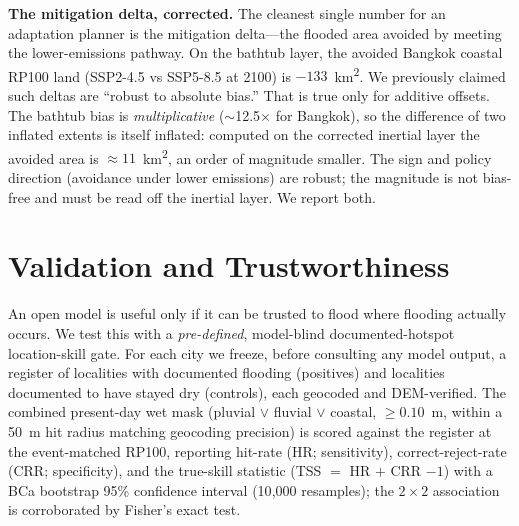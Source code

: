 \documentclass[conference]{IEEEtran}
\begin{document}
\textbf{The mitigation delta, corrected.} The cleanest single number for an adaptation planner is the mitigation delta---the flooded area avoided by meeting the lower-emissions pathway. On the bathtub layer, the avoided Bangkok coastal RP100 land (SSP2-4.5 vs SSP5-8.5 at 2100) is $-133$~km\textsuperscript{2}. We previously claimed such deltas are ``robust to absolute bias.'' That is true only for additive offsets. The bathtub bias is \emph{multiplicative} ($\sim$12.5$\times$ for Bangkok), so the difference of two inflated extents is itself inflated: computed on the corrected inertial layer the avoided area is ${\approx}11$~km\textsuperscript{2}, an order of magnitude smaller. The sign and policy direction (avoidance under lower emissions) are robust; the magnitude is not bias-free and must be read off the inertial layer. We report both.

\section{Validation and Trustworthiness}
\label{sec:validation}
An open model is useful only if it can be trusted to flood where flooding actually occurs. We test this with a \emph{pre-defined}, model-blind documented-hotspot location-skill gate. For each city we freeze, before consulting any model output, a register of localities with documented flooding (positives) and localities documented to have stayed dry (controls), each geocoded and DEM-verified. The combined present-day wet mask (pluvial $\vee$ fluvial $\vee$ coastal, $\geq 0.10$~m, within a 50~m hit radius matching geocoding precision) is scored against the register at the event-matched RP100, reporting hit-rate (HR; sensitivity), correct-reject-rate (CRR; specificity), and the true-skill statistic (TSS $=$ HR $+$ CRR $- 1$) with a BCa bootstrap 95\% confidence interval (10{,}000 resamples); the $2\times2$ association is corroborated by Fisher's exact test.
\end{document}
